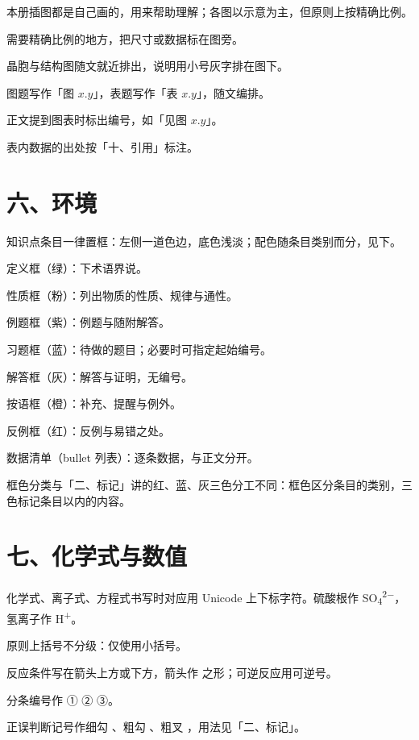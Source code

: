\begin{fanli}
  \item 本册插图都是自己画的，用来帮助理解；各图以示意为主，但原则上按精确比例。
  \item 需要精确比例的地方，把尺寸或数据标在图旁。
  \item 晶胞与结构图随文就近排出，说明用小号灰字排在图下。
  \item 图题写作「图 \(x.y\)」，表题写作「表 \(x.y\)」，随文编排。
  \item 正文提到图表时标出编号，如「见图 \(x.y\)」。
  \item 表内数据的出处按「十、引用」标注。
\end{fanli}

\section*{六、环境}

\begin{fanli}
  \item 知识点条目一律置框：左侧一道色边，底色浅淡；配色随条目类别而分，见下。
  \item 定义框（绿）：下术语界说。
  \item 性质框（粉）：列出物质的性质、规律与通性。
  \item 例题框（紫）：例题与随附解答。
  \item 习题框（蓝）：待做的题目；必要时可指定起始编号。
  \item 解答框（灰）：解答与证明，无编号。
  \item 按语框（橙）：补充、提醒与例外。
  \item 反例框（红）：反例与易错之处。
  \item 数据清单（bullet 列表）：逐条数据，与正文分开。
  \item 框色分类与「二、标记」讲的红、蓝、灰三色分工不同：框色区分条目的类别，三色标记条目以内的内容。
\end{fanli}

\section*{七、化学式与数值}

\begin{fanli}
  \item 化学式、离子式、方程式书写时对应用 Unicode 上下标字符。硫酸根作 SO\textsubscript{4}\textsuperscript{2−}，氢离子作 H\textsuperscript{+}。
  \item 原则上括号不分级：仅使用小括号。
  \item 反应条件写在箭头上方或下方，箭头作  之形；可逆反应用可逆号。
  \item 分条编号作 ① ② ③。
  \item 正误判断记号作细勾 \cmark{}、粗勾 \hcmark{}、粗叉 \hxmark{}，用法见「二、标记」。
\end{fanli}

